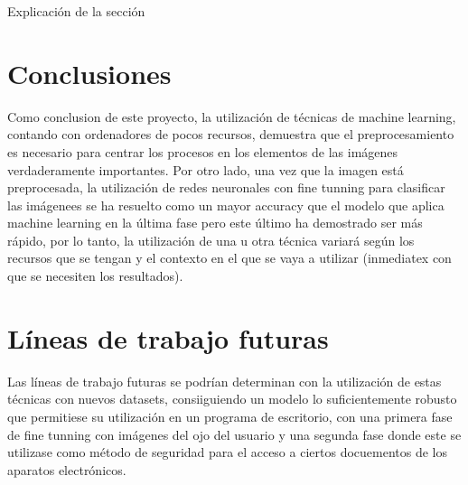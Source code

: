  \label{capitulo7}

Explicación de la sección

\section{Conclusiones}
Como conclusion de este proyecto, la utilización de técnicas de machine learning, contando con ordenadores de pocos recursos, demuestra que el preprocesamiento
es necesario para centrar los procesos en los elementos de las imágenes verdaderamente importantes. Por otro lado, una vez que la imagen está preprocesada, la utilización 
de redes neuronales con fine tunning para clasificar las imágenees se ha resuelto como un mayor accuracy que el modelo que aplica machine learning en la última fase
pero este último ha demostrado ser más rápido, por lo tanto, la utilización de una u otra técnica variará según los recursos que se tengan y el contexto en el que se 
vaya a utilizar (inmediatex con que se necesiten los resultados).

\section{Líneas de trabajo futuras}

Las líneas de trabajo futuras se podrían determinan con la utilización de estas técnicas con nuevos datasets, consiiguiendo un modelo lo suficientemente robusto
que permitiese su utilización en un programa de escritorio, con una primera fase de fine tunning con imágenes del ojo del usuario y una segunda fase donde este 
se utilizase como método de seguridad para el acceso a ciertos docuementos de los aparatos electrónicos.